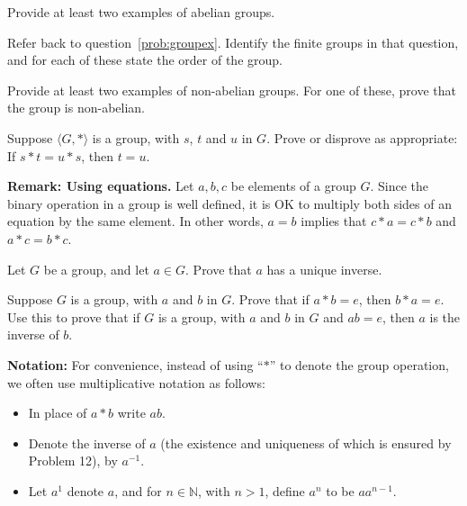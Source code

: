 \begin{problem}
Provide at least two examples of abelian groups.
\end{problem}

\begin{problem}
Refer back to question~\ref{prob:groupex}. Identify the finite groups in that question, and for each of these state the order of the group.
\end{problem}

\begin{problem}
Provide at least two examples of non-abelian groups. For one of these, prove that the group is non-abelian.
\end{problem}

\begin{problem}
Suppose \( \langle G, * \rangle \) is a group, with \(s\), \(t\) and \(u\) in \(G\). Prove or disprove as appropriate: If \( s * t = u * s \), then \(t = u\).
\end{problem}

\textbf{Remark: Using equations.} Let \(a, b, c\) be elements of a group \(G\). Since the binary operation in a group is well defined, it is OK to multiply both sides of an equation by the same element. In other words, \(a = b\) implies that \( c * a = c * b\) and \(a * c = b * c\).

\begin{problem}
Let \(G\) be a group, and let \(a \in G\). Prove that \(a\) has a unique inverse.
\end{problem}

\begin{problem}
Suppose \(G\) is a group, with \(a\) and \(b\) in \(G\). Prove that if \(a * b = e\), then \(b * a = e\). Use this to prove that if \(G\) is a group, with \(a\) and \(b\) in \(G\) and \(ab = e\), then \(a\) is the inverse of \(b\).
\end{problem}

\textbf{Notation:} For convenience, instead of using ``\(*\)'' to denote the group operation, we often use multiplicative notation as follows:
\begin{itemize}
  \item In place of \(a * b\) write \(ab\).
  \item Denote the inverse of \(a\) (the existence and uniqueness of which is ensured by Problem 12), by \(a^{-1}\).
  \item Let \(a^1\) denote \(a\), and for \(n \in \mathbb{N}\), with \(n > 1\), define \(a^n\) to be \(aa^{n-1}\).
\end{itemize}

